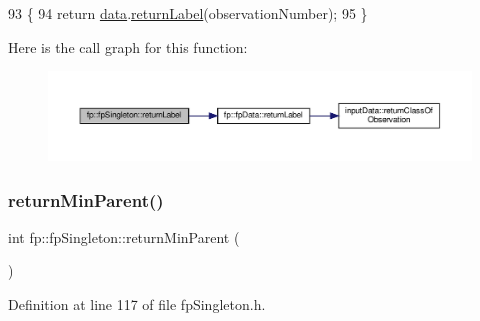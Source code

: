 \begin{DoxyCode}
93                                                          \{
94                 \textcolor{keywordflow}{return} \hyperlink{classfp_1_1fpSingleton_a2fa16ac6a0f66641749032eeee61b8e9}{data}.\hyperlink{classfp_1_1fpData_aac722f51424cb7f6ab7d89525f82cc72}{returnLabel}(observationNumber);
95             \}
\end{DoxyCode}
Here is the call graph for this function\+:\nopagebreak
\begin{figure}[H]
\begin{center}
\leavevmode
\includegraphics[width=350pt]{classfp_1_1fpSingleton_aa2f644b1521948fb994f4087ddfaea14_cgraph}
\end{center}
\end{figure}
\mbox{\label{classfp_1_1fpSingleton_a2d06406b6462099e0adb393218090420}} 
\subsubsection{\texorpdfstring{return\+Min\+Parent()}{returnMinParent()}}
{\footnotesize\ttfamily int fp\+::fp\+Singleton\+::return\+Min\+Parent (\begin{DoxyParamCaption}{ }\end{DoxyParamCaption})\hspace{0.3cm}{\ttfamily [inline]}}



Definition at line 117 of file fp\+Singleton.\+h.


